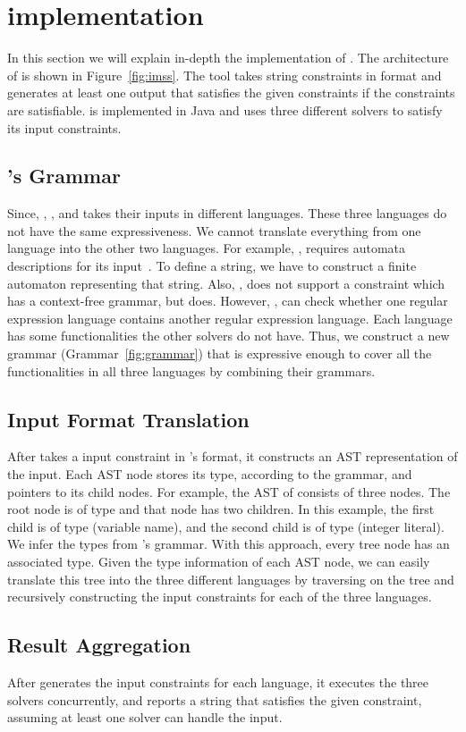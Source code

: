 \section{implementation}
\label{sec:implementation}
In this section we will explain in-depth the implementation of \imss.
The architecture of \imss is shown
in Figure~\ref{fig:imss}. The tool takes string constraints in \imss format
and generates at least one output that satisfies the given constraints if the constraints are satisfiable.
\imss is implemented in Java and uses three different solvers to satisfy its input constraints.


\subsection{\imss's Grammar}
Since, \hampi, \dprle, and \zstr takes their inputs in
 different languages. These three languages do not have the same expressiveness.
 We cannot translate everything from one language into the other two languages. For example,
 \dprle, requires automata descriptions for its input~\cite{lazystrings2010}.
 To define a string, we have to construct a finite automaton representing that string.
 Also, \dprle, does not support a constraint which has a context-free grammar,
 but \hampi does. However, \dprle, can check whether one regular expression language
 contains another regular expression language. Each language has some functionalities the
 other solvers do not have. Thus, we construct a new grammar (Grammar~\ref{fig:grammar}) that is expressive enough to
 cover all the functionalities in all three languages by combining their grammars.

\subsection{Input Format Translation}
After \imss takes a input constraint in \imss's format, it constructs an AST representation of the input.
Each AST node stores its type, according to the grammar, and pointers to its child nodes.
For example, the AST of  consists of three nodes. The root node is of type
 and that node has two children. In this example, the first child is of type  (variable name), and
the second child is of type  (integer literal). We infer the types from \imss's grammar.
With this approach, every tree node has an associated type. Given the type information of
each AST node, we can easily translate this tree into the three different languages by traversing
on the tree and recursively constructing the input constraints for each of the three languages.

\subsection{Result Aggregation}
After \imss generates the input constraints for each language, it executes the three solvers concurrently, and
reports a string that satisfies the given constraint, assuming at least one solver can handle the input.
